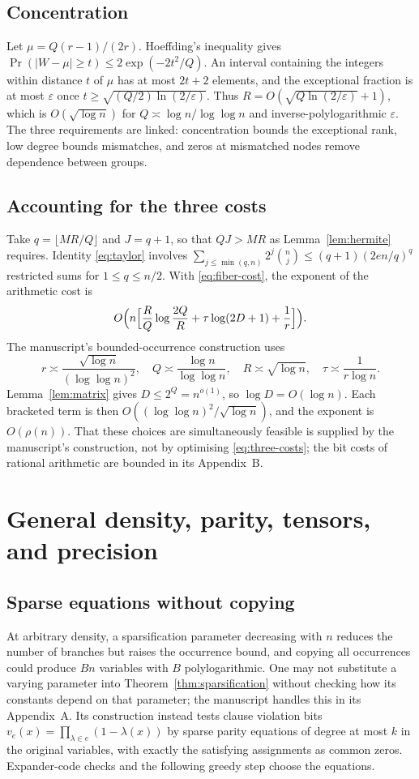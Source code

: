 \documentclass[11pt,reqno]{amsart}
\numberwithin{equation}{section}
\theoremstyle{plain}
\theoremstyle{definition}
\theoremstyle{remark}
\begin{document}
\subsection{Concentration}
Let $\mu=Q(r-1)/(2r)$. Hoeffding's inequality \cite{Hoeffding} gives
$\Pr(|W-\mu|\ge t)\le2\exp(-2t^2/Q)$. An interval containing the integers
within distance $t$ of $\mu$ has at most $2t+2$ elements, and the exceptional
fraction is at most $\varepsilon$ once $t\ge\sqrt{(Q/2)\ln(2/\varepsilon)}$.
Thus $R=O(\sqrt{Q\ln(2/\varepsilon)}+1)$, which is $O(\sqrt{\log n})$ for
$Q\asymp\log n/\log\log n$ and inverse-polylogarithmic $\varepsilon$. The
three requirements are linked: concentration bounds the exceptional rank,
low degree bounds mismatches, and zeros at mismatched nodes remove
dependence between groups.

\subsection{Accounting for the three costs}
Take $q=\lfloor MR/Q\rfloor$ and $J=q+1$, so that $QJ>MR$ as
Lemma~\ref{lem:hermite} requires. Identity \eqref{eq:taylor} involves
$\sum_{j\le\min(q,n)}2^j\binom nj\le(q+1)(2en/q)^q$ restricted sums for
$1\le q\le n/2$. With \eqref{eq:fiber-cost}, the exponent of the arithmetic
cost is
\begin{equation}\label{eq:three-costs}
 O\Bigl(n\Bigl[\frac RQ\log\frac{2Q}R+\tau\log(2D+1)+\frac1r\Bigr]\Bigr).
\end{equation}
The manuscript's bounded-occurrence construction uses
\[
 r\asymp\frac{\sqrt{\log n}}{(\log\log n)^2},\quad
 Q\asymp\frac{\log n}{\log\log n},\quad
 R\asymp\sqrt{\log n},\quad
 \tau\asymp\frac1{r\log n}.
\]
Lemma~\ref{lem:matrix} gives $D\le2^Q=n^{o(1)}$, so $\log D=O(\log n)$.
Each bracketed term is then $O((\log\log n)^2/\sqrt{\log n})$, and the
exponent is $O(\rho(n))$. That these choices are simultaneously feasible is
supplied by the manuscript's construction, not by optimising
\eqref{eq:three-costs}; the bit costs of rational arithmetic are bounded in
its Appendix~B.

\section{General density, parity, tensors, and precision}\label{sec:tensors}

\subsection{Sparse equations without copying}
At arbitrary density, a sparsification parameter decreasing with $n$ reduces
the number of branches but raises the occurrence bound, and copying all
occurrences could produce $Bn$ variables with $B$ polylogarithmic. One may
not substitute a varying parameter into Theorem~\ref{thm:sparsification}
without checking how its constants depend on that parameter; the manuscript
handles this in its Appendix~A. Its construction instead tests clause
violation bits $v_e(x)=\prod_{\lambda\in e}(1-\lambda(x))$ by sparse parity
equations of degree at most $k$ in the original variables, with exactly the
satisfying assignments as common zeros. Expander-code checks and the
following greedy step choose the equations.
\end{document}
